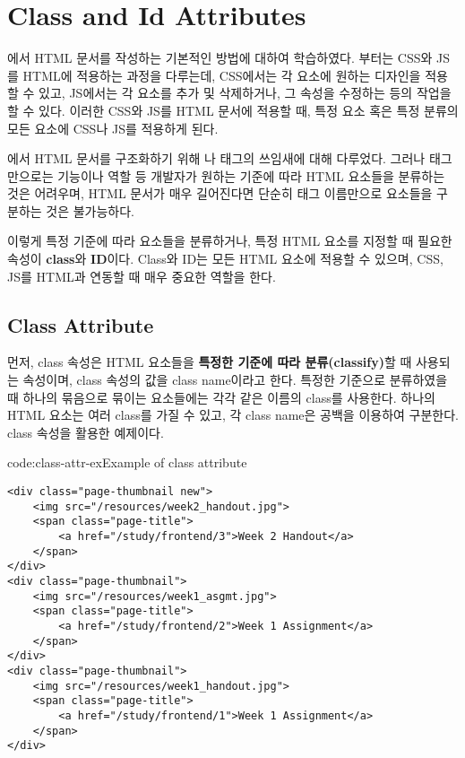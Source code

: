 \section{Class and Id Attributes}\label{sect:class-and-id-attributes}

에서 HTML 문서를 작성하는 기본적인 방법에 대하여 학습하였다. 부터는 CSS와 JS를 HTML에 적용하는 과정을 다루는데, CSS에서는 각 요소에 원하는 디자인을 적용할 수 있고, JS에서는 각 요소를 추가 및 삭제하거나, 그 속성을 수정하는 등의 작업을 할 수 있다. 이러한 CSS와 JS를 HTML 문서에 적용할 때, 특정 요소 혹은 특정 분류의 모든 요소에 CSS나 JS를 적용하게 된다.

에서 HTML 문서를 구조화하기 위해 나  태그의 쓰임새에 대해 다루었다. 그러나 태그만으로는 기능이나 역할 등 개발자가 원하는 기준에 따라 HTML 요소들을 분류하는 것은 어려우며, HTML 문서가 매우 길어진다면 단순히 태그 이름만으로 요소들을 구분하는 것은 불가능하다.

이렇게 특정 기준에 따라 요소들을 분류하거나, 특정 HTML 요소를 지정할 때 필요한 속성이 \textbf{class}와 \textbf{ID}이다. Class와 ID는 모든 HTML 요소에 적용할 수 있으며, CSS, JS를 HTML과 연동할 때 매우 중요한 역할을 한다.

\subsection*{Class Attribute}
먼저, class 속성은 HTML 요소들을 \textbf{특정한 기준에 따라 분류(classify)}할 때 사용되는 속성이며, class 속성의 값을 class name이라고 한다. 특정한 기준으로 분류하였을 때 하나의 묶음으로 묶이는 요소들에는 각각 같은 이름의 class를 사용한다. 하나의 HTML 요소는 여러 class를 가질 수 있고, 각 class name은 공백을 이용하여 구분한다. \은 class 속성을 활용한 예제이다.

\begin{codeenv}{code:class-attr-ex}{Example of class attribute}\begin{verbatim}
<div class="page-thumbnail new">
    <img src="/resources/week2_handout.jpg">
    <span class="page-title">
        <a href="/study/frontend/3">Week 2 Handout</a>
    </span>
</div>
<div class="page-thumbnail">
    <img src="/resources/week1_asgmt.jpg">
    <span class="page-title">
        <a href="/study/frontend/2">Week 1 Assignment</a>
    </span>
</div>
<div class="page-thumbnail">
    <img src="/resources/week1_handout.jpg">
    <span class="page-title">
        <a href="/study/frontend/1">Week 1 Assignment</a>
    </span>
</div>
\end{verbatim}
\end{codeenv}
\clearpage

